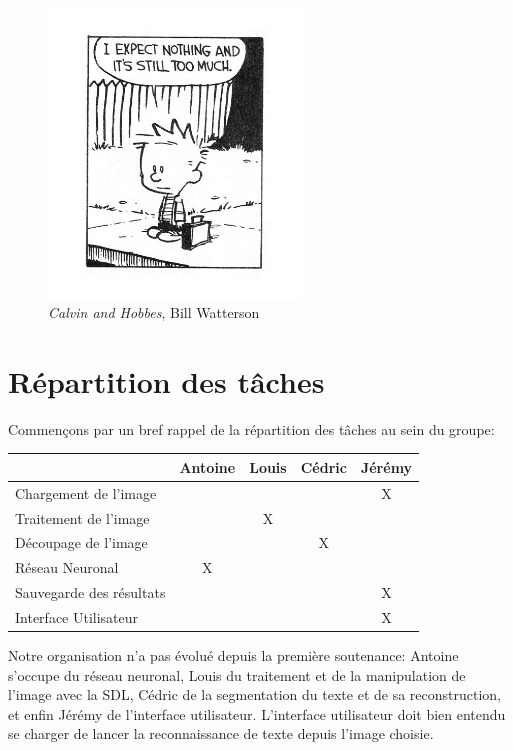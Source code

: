 \documentclass[12pt]{report}
\begin{document}
\begin{figure}
    \centering
    \includegraphics[width=0.6\textwidth]{project_mood_S2}
    \caption*{\textit{Calvin and Hobbes}, Bill Watterson}
\end{figure}

\chapter{Répartition des tâches}

Commençons par un bref rappel de la répartition des tâches au sein du groupe:

\begin{center}
    \begin{tabular}{@{} l *4c @{}}
        \toprule
        \multicolumn{1}{c}{}    & \textbf{Antoine}  & \textbf{Louis}  & \textbf{Cédric} & \textbf{Jérémy} \\ 
        \midrule
        Chargement de l'image & & & & X \\
        Traitement de l'image & & X & & \\
        Découpage de l'image & & & X & \\
        Réseau Neuronal & X & & & \\
        Sauvegarde des résultats & & & & X \\
        Interface Utilisateur & & & & X \\
        \bottomrule
    \end{tabular}
\end{center}


Notre organisation n'a pas évolué depuis la première soutenance: Antoine s'occupe du réseau neuronal, Louis du traitement et de la manipulation de l'image avec la SDL, Cédric de la segmentation du texte et de sa reconstruction, et enfin Jérémy de l'interface utilisateur. L'interface utilisateur doit bien entendu se charger de lancer la reconnaissance de texte depuis l'image choisie.
\end{document}

